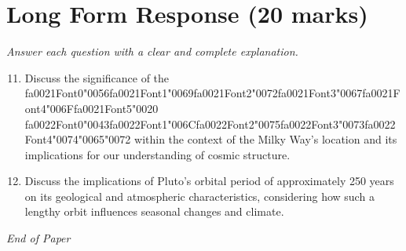 \documentclass[12pt]{article}
\begin{document}
\section*{Long Form Response (20 marks)}
\textit{Answer each question with a clear and complete explanation.}
\begin{enumerate}[label=\arabic*.]
\setcounter{enumi}{10}
\item Discuss the significance of the {\csname fa0021Font0\endcsname\char"0056}{\csname fa0021Font1\endcsname\char"0069}{\csname fa0021Font2\endcsname\char"0072}{\csname fa0021Font3\endcsname\char"0067}{\csname fa0021Font4\endcsname\char"006F}{\csname fa0021Font5\endcsname\char"0020} {\csname fa0022Font0\endcsname\char"0043}{\csname fa0022Font1\endcsname\char"006C}{\csname fa0022Font2\endcsname\char"0075}{\csname fa0022Font3\endcsname\char"0073}{\csname fa0022Font4\endcsname\char"0074}{\char"0065}{\char"0072} within the context of the Milky
Way's location and its implications for our understanding of cosmic structure.
\item Discuss the implications of Pluto's orbital period of approximately 250 years on its
geological and atmospheric characteristics, considering how such a lengthy orbit
influences seasonal changes and climate.
\end{enumerate}

\vfill
\noindent\textit{End of Paper}
\end{document}
